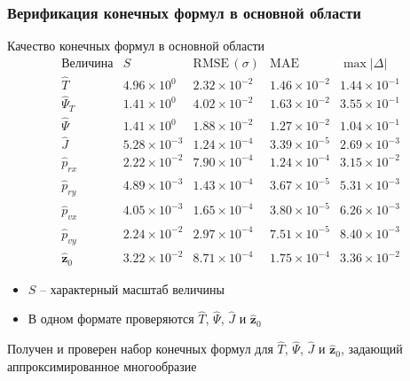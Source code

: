 \begin{frame}
    \frametitle{Верификация конечных формул в основной области}
    \presentationtextsize
    \centering
    Качество конечных формул в основной области
    \[
    \begin{array}{c|c|c|c|c}
    \text{Величина} & S & \mathrm{RMSE}\,(\sigma) & \mathrm{MAE} & \max|\Delta|\\
    \hline
    \widehat T
    & 4.96\times10^{0}
    & 2.32\times10^{-2}
    & 1.46\times10^{-2}
    & 1.44\times10^{-1}\\
    \widehat\Psi_T
    & 1.41\times10^{0}
    & 4.02\times10^{-2}
    & 1.63\times10^{-2}
    & 3.55\times10^{-1}\\
    \widehat\Psi
    & 1.41\times10^{0}
    & 1.88\times10^{-2}
    & 1.27\times10^{-2}
    & 1.04\times10^{-1}\\
    \widehat J
    & 5.28\times10^{-3}
    & 1.24\times10^{-4}
    & 3.39\times10^{-5}
    & 2.69\times10^{-3}\\
    \widehat p_{rx}
    & 2.22\times10^{-2}
    & 7.90\times10^{-4}
    & 1.24\times10^{-4}
    & 3.15\times10^{-2}\\
    \widehat p_{ry}
    & 4.89\times10^{-3}
    & 1.43\times10^{-4}
    & 3.67\times10^{-5}
    & 5.31\times10^{-3}\\
    \widehat p_{vx}
    & 4.05\times10^{-3}
    & 1.65\times10^{-4}
    & 3.80\times10^{-5}
    & 6.26\times10^{-3}\\
    \widehat p_{vy}
    & 2.24\times10^{-2}
    & 2.97\times10^{-4}
    & 7.51\times10^{-5}
    & 8.40\times10^{-3}\\
    \widehat{\mathbf z}_0
    & 3.22\times10^{-2}
    & 8.71\times10^{-4}
    & 1.75\times10^{-4}
    & 3.36\times10^{-2}
    \end{array}
    \]
    \begin{itemize}
        \item \(S\) -- характерный масштаб величины
        \item В одном формате проверяются \(\widehat T\), \(\widehat\Psi\), \(\widehat J\) и \(\widehat{\mathbf z}_0\)
    \end{itemize}
    \begin{newresult}
        Получен и проверен набор конечных формул для \(\widehat T\), \(\widehat\Psi\), \(\widehat J\) и \(\widehat{\mathbf z}_0\), задающий аппроксимированное многообразие
    \end{newresult}
\end{frame}
